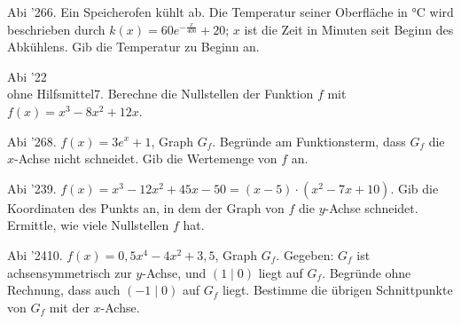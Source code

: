 \documentclass[11pt]{article}
\begin{document}
\pfgruppe{}
\begin{pfaufg}{Abi ’26}{6.}{}
Ein Speicherofen kühlt ab. Die Temperatur seiner Oberfläche in °C wird beschrieben durch $k(x) = 60e^{-\tfrac{x}{400}} + 20$; $x$ ist die Zeit in Minuten seit Beginn des Abkühlens. Gib die Temperatur zu Beginn an.
\end{pfaufg}
\pfgruppe{}
\begin{pfaufg}{Abi ’22\\ohne Hilfsmittel}{7.}{}
Berechne die Nullstellen der Funktion $f$ mit $f(x) = x^3 - 8x^2 + 12x$.
\end{pfaufg}
\pfgruppe{}
\begin{pfaufg}{Abi ’26}{8.}{}
$f(x) = 3e^x + 1$, Graph $G_f$. Begründe am Funktionsterm, dass $G_f$ die $x$-Achse nicht schneidet. Gib die Wertemenge von $f$ an.
\par\smallskip\noindent {}\par
{}
\fusshilfe{\mbox{8:~keine Nullstelle; Wertemenge ]1; $\infty$[}}
\end{pfaufg}
\pfgruppe{}
\begin{pfaufg}{Abi ’23}{9.}{}
$f(x) = x^3 - 12x^2 + 45x - 50 = (x - 5)\cdot(x^2 - 7x + 10)$. Gib die Koordinaten des Punkts an, in dem der Graph von $f$ die $y$-Achse schneidet. Ermittle, wie viele Nullstellen $f$ hat.
\end{pfaufg}
\pfgruppe{}
\begin{pfaufg}{Abi ’24}{10.}{}
$f(x) = 0{,}5x^4 - 4x^2 + 3{,}5$, Graph $G_f$. Gegeben: $G_f$ ist achsensymmetrisch zur $y$-Achse, und $(1 \mid 0)$ liegt auf $G_f$. Begründe ohne Rechnung, dass auch $(-1 \mid 0)$ auf $G_f$ liegt. Bestimme die übrigen Schnittpunkte von $G_f$ mit der $x$-Achse.
\end{pfaufg}
\end{document}
